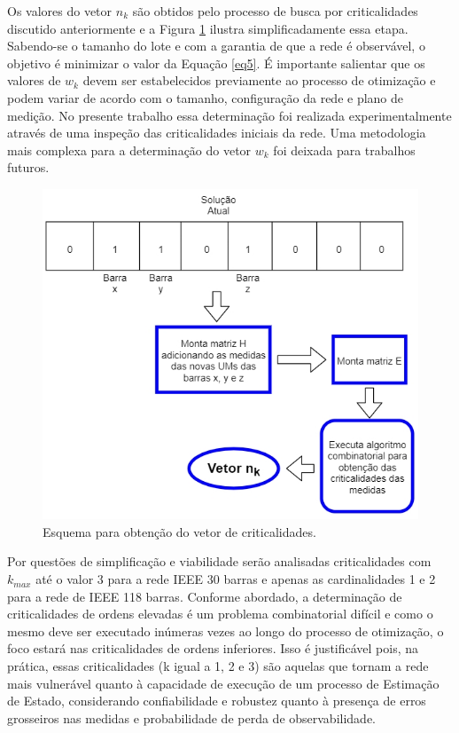 \documentclass[12pt]{article}
\begin{document}
Os valores do vetor $n_k$ são obtidos pelo processo de busca por criticalidades discutido anteriormente e a Figura \ref{fig5} ilustra simplificadamente essa etapa. Sabendo-se o tamanho do lote e com a garantia de que a rede é observável, o objetivo é minimizar o valor da Equação \ref{eq5}. É importante salientar que os valores de $w_k$ devem ser estabelecidos previamente ao processo de otimização e podem variar de acordo com o tamanho, configuração da rede e plano de medição. No presente trabalho essa determinação foi realizada experimentalmente através de uma inspeção das criticalidades iniciais da rede. Uma metodologia mais complexa para a determinação do vetor $w_k$ foi deixada para trabalhos futuros.

\begin{figure}[H]
	\centering 
	\includegraphics[scale=0.75]{figuras/Gera_nk.jpg}
	\caption{Esquema para obtenção do vetor de criticalidades.}
	\label{fig5} %
\end{figure}

Por questões de simplificação e viabilidade serão analisadas criticalidades com  $k_{max}$ até o valor 3 para a rede IEEE 30 barras e apenas as cardinalidades 1 e 2 para a rede de IEEE 118 barras. Conforme abordado, a determinação de criticalidades de ordens elevadas é um problema combinatorial difícil e como o mesmo deve ser executado inúmeras vezes ao longo do processo de otimização, o foco estará nas criticalidades de ordens inferiores. Isso é justificável pois, na prática, essas criticalidades (k igual a 1, 2 e 3) são aquelas que tornam a rede mais vulnerável quanto à capacidade de execução de um processo de Estimação de Estado, considerando confiabilidade e robustez quanto à presença de erros grosseiros nas medidas e probabilidade de perda de observabilidade.
\end{document}

